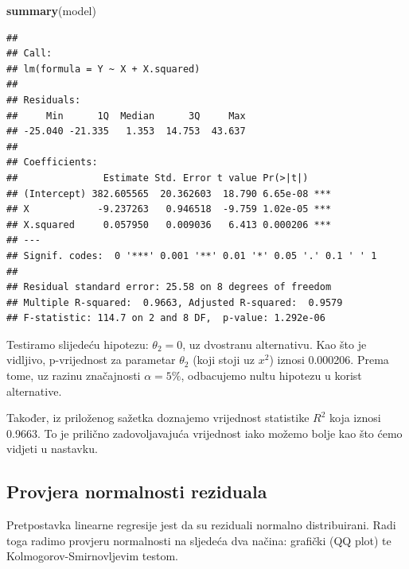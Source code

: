 \documentclass[]{article}
\newenvironment{Shaded}{\begin{snugshade}}{\end{snugshade}}
\newcommand{\KeywordTok}[1]{\textcolor[rgb]{0.13,0.29,0.53}{\textbf{{#1}}}}
\newcommand{\DataTypeTok}[1]{\textcolor[rgb]{0.13,0.29,0.53}{{#1}}}
\newcommand{\DecValTok}[1]{\textcolor[rgb]{0.00,0.00,0.81}{{#1}}}
\newcommand{\StringTok}[1]{\textcolor[rgb]{0.31,0.60,0.02}{{#1}}}
\newcommand{\NormalTok}[1]{{#1}}
\begin{document}
\begin{Shaded}
\begin{Highlighting}[]
\KeywordTok{summary}\NormalTok{(model)}
\end{Highlighting}
\end{Shaded}

\begin{verbatim}
## 
## Call:
## lm(formula = Y ~ X + X.squared)
## 
## Residuals:
##     Min      1Q  Median      3Q     Max 
## -25.040 -21.335   1.353  14.753  43.637 
## 
## Coefficients:
##               Estimate Std. Error t value Pr(>|t|)    
## (Intercept) 382.605565  20.362603  18.790 6.65e-08 ***
## X            -9.237263   0.946518  -9.759 1.02e-05 ***
## X.squared     0.057950   0.009036   6.413 0.000206 ***
## ---
## Signif. codes:  0 '***' 0.001 '**' 0.01 '*' 0.05 '.' 0.1 ' ' 1
## 
## Residual standard error: 25.58 on 8 degrees of freedom
## Multiple R-squared:  0.9663, Adjusted R-squared:  0.9579 
## F-statistic: 114.7 on 2 and 8 DF,  p-value: 1.292e-06
\end{verbatim}

Testiramo slijedeću hipotezu: \(\theta_2 = 0\), uz dvostranu
alternativu. Kao što je vidljivo, p-vrijednost za parametar \(\theta_2\)
(koji stoji uz \(x^ 2\)) iznosi 0.000206. Prema tome, uz razinu
značajnosti \(\alpha=5\%\), odbacujemo nultu hipotezu u korist
alternative.

Također, iz priloženog sažetka doznajemo vrijednost statistike \(R^2\)
koja iznosi 0.9663. To je prilično zadovoljavajuća vrijednost iako
možemo bolje kao što ćemo vidjeti u nastavku.

\subsection{Provjera normalnosti
reziduala}\label{provjera-normalnosti-reziduala}

Pretpostavka linearne regresije jest da su reziduali normalno
distribuirani. Radi toga radimo provjeru normalnosti na sljedeća dva
načina: grafički (QQ plot) te Kolmogorov-Smirnovljevim testom.

\begin{Shaded}
\end{Shaded}
\end{document}
